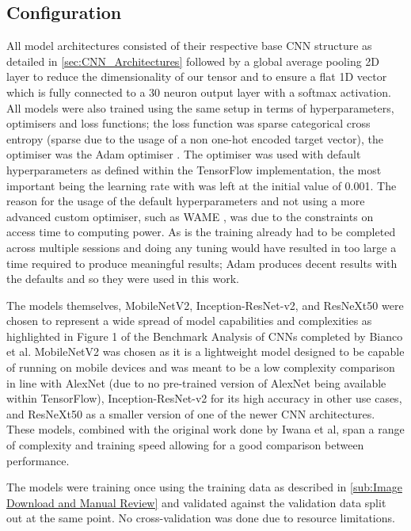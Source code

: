 \documentclass[12pt]{article}
\numberwithin{equation}{section}
\numberwithin{figure}{section}
\begin{document}
\subsection{Configuration} 
\label{sub:Configuration} 
All model architectures consisted of their respective base CNN structure as detailed in \cref{sec:CNN_Architectures} followed by a global average pooling 2D layer to reduce the dimensionality of our tensor and to ensure a flat 1D vector which is fully connected to a 30 neuron output layer with a softmax activation. All models were also trained using the same setup in terms of hyperparameters, optimisers and loss functions; the loss function was sparse categorical cross entropy (sparse due to the usage of a non one-hot encoded target vector), the optimiser was the Adam optimiser \cite{Kingma2015}. The optimiser was used with default hyperparameters as defined within the TensorFlow implementation, the most important being the learning rate with was left at the initial value of 0.001. The reason for the usage of the default hyperparameters and not using a more advanced custom optimiser, such as WAME \cite{Mosca2017}, was due to the constraints on access time to computing power. As is the training already had to be completed across multiple sessions and doing any tuning would have resulted in too large a time required to produce meaningful results; Adam produces decent results with the defaults and so they were used in this work.

The models themselves, MobileNetV2, Inception-ResNet-v2, and ResNeXt50 were chosen to represent a wide spread of model capabilities and complexities as highlighted in Figure 1 of the Benchmark Analysis of CNNs completed by Bianco et al\cite{Bianco2018}. MobileNetV2 was chosen as it is a lightweight model designed to be capable of running on mobile devices and was meant to be a low complexity comparison in line with AlexNet (due to no pre-trained version of AlexNet being available within TensorFlow), Inception-ResNet-v2 for its high accuracy in other use cases, and ResNeXt50 as a smaller version of one of the newer CNN architectures. These models, combined with the original work done by Iwana et al, span a range of complexity and training speed allowing for a good comparison between performance.

The models were training once using the training data as described in \cref{sub:Image Download and Manual Review} and validated against the validation data split out at the same point. No cross-validation was done due to resource limitations.
\end{document}
